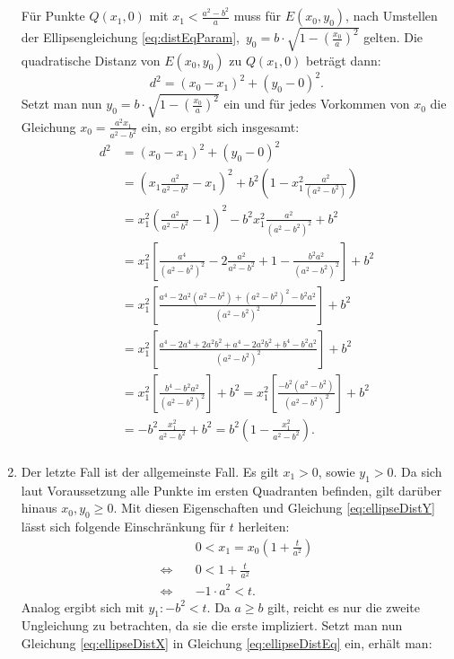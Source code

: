 \begin{enumerate}
	Für Punkte $Q(x_1,0)$ mit $x_1 < \frac{a^2 - b^2}{a}$ muss für $E(x_0,y_0)$, nach Umstellen der Ellipsengleichung \ref{eq:distEqParam},~$y_0 = b\cdot\sqrt{1-\left(\frac{x_0}{a}\right)^2}$ gelten.
	Die quadratische Distanz von $E(x_0,y_0)$ zu $Q(x_1,0)$ beträgt dann:
	\[
		d^2 = (x_0 - x_1)^2 + (y_0 - 0)^2.
	\] %
	Setzt man nun $y_0 = b\cdot\sqrt{1-\left(\frac{x_0}{a}\right)^2}$ ein und für jedes Vorkommen von $x_0$ die Gleichung $x_0 = \frac{a^2x_1}{a^2 - b^2}$ ein, so ergibt sich insgesamt:
	\[
	\begin{aligned}
	d^2 &= (x_0 - x_1)^2 + (y_0 - 0)^2 \\
	&= \left(x_1\frac{a^2}{a^2-b^2} - x_1\right)^2 + b^2\left(1 - x_1^2\frac{a^2}{(a^2-b^2)}\right) \\
	&= x_1^2\left(\frac{a^2}{a^2-b^2} - 1\right)^2 - b^2x_1^2\frac{a^2}{\left(a^2-b^2\right)^2} + b^2 \\
	&= x_1^2\left[\frac{a^4}{\left(a^2-b^2\right)^2} - 2\frac{a^2}{a^2-b^2} + 1 - \frac{b^2a^2}{\left(a^2-b^2\right)^2}\right] + b^2\\
	&= x_1^2\left[\frac{a^4 - 2a^2(a^2-b^2) + \left(a^2-b^2\right)^2 - b^2a^2}{\left(a^2-b^2\right)^2}\right] + b^2\\
	&= x_1^2\left[\frac{a^4 - 2a^4 + 2a^2b^2 + a^4 -2a^2b^2 + b^4 - b^2a^2}{\left(a^2-b^2\right)^2}\right] + b^2\\
	&= x_1^2\left[\frac{b^4-b^2a^2}{\left(a^2-b^2\right)^2}\right] + b^2 = x_1^2\left[\frac{-b^2\left(a^2-b^2\right)}{\left(a^2-b^2\right)^2}\right] + b^2 \\
	&= -b^2\frac{x_1^2}{a^2-b^2} + b^2 = b^2\left(1-\frac{x_1^2}{a^2-b^2}\right).\\
	\end{aligned}
	\] %
	\item Der letzte Fall ist der allgemeinste Fall. Es gilt $x_1 > 0$, sowie $y_1 > 0$. Da sich laut Voraussetzung alle Punkte im ersten Quadranten befinden, gilt darüber hinaus $x_0, y_0 \geq 0$. Mit diesen Eigenschaften und Gleichung \ref{eq:ellipseDistY} lässt sich folgende Einschränkung für $t$ herleiten:
\[
	\begin{aligned}
	& 0 < x_1 = x_0\left(1 + \frac{t}{a^2}\right)\\
	\Leftrightarrow\quad& 0 < 1 + \frac{t}{a^2} \\
	\Leftrightarrow\quad& -1\cdot a^2 < t.
	\end{aligned}
\]
	Analog ergibt sich mit $y_1\colon -b^2 < t$. Da $a\geq b$ gilt, reicht es nur die zweite Ungleichung zu betrachten, da sie die erste impliziert. Setzt man nun Gleichung \ref{eq:ellipseDistX} in Gleichung \ref{eq:ellipseDistEq} ein, erhält man:


\end{enumerate}
